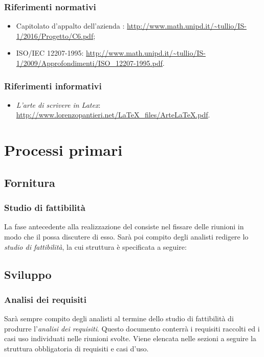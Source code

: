 \subsubsection{Riferimenti normativi}
\begin{itemize}
	\item Capitolato d'appalto dell'azienda \ZU: \url{http://www.math.unipd.it/~tullio/IS-1/2016/Progetto/C6.pdf};
	\item ISO/IEC 12207-1995: \url{http://www.math.unipd.it/\~tullio/IS-1/2009/Approfondimenti/ISO_12207-1995.pdf}.
\end{itemize}

\subsubsection{Riferimenti informativi}
\begin{itemize}
	\item \emph{L'arte di scrivere in Latex}: \url{http://www.lorenzopantieri.net/LaTeX_files/ArteLaTeX.pdf}.
\end{itemize}




\section{Processi primari}

\subsection{Fornitura}

	\subsubsection{Studio di fattibilità}
	La fase antecedente alla realizzazione del  consiste nel fissare delle riunioni in modo che il  possa discutere di esso. Sarà poi compito degli analisti redigere lo \textit{studio di fattibilità}, la cui struttura è specificata a seguire: %

\subsection{Sviluppo}
	\subsubsection{Analisi dei requisiti}
	Sarà sempre compito degli analisti al termine dello studio di fattibilità di produrre l'\textit{analisi dei requisiti}. Questo documento conterrà i requisiti raccolti ed i casi uso individuati nelle riunioni svolte.
	Viene elencata nelle sezioni a seguire la struttura obbligatoria di requisiti e casi d'uso.
